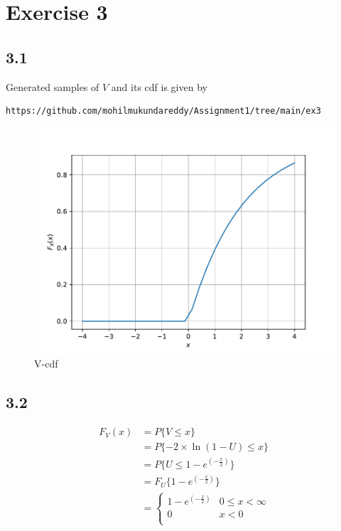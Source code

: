 \documentclass[journal,12pt,twocolumn]{IEEEtran}
\begin{document}
\section*{Exercise 3}
\subsection*{3.1}
Generated samples of $V$ and its cdf is given by
\begin{lstlisting}
https://github.com/mohilmukundareddy/Assignment1/tree/main/ex3
\end{lstlisting}
\begin{figure}[H]
    \centering
    \includegraphics[scale =0.5]{V_cdf.pdf}
    \caption{V-cdf}
    \label{fig:my_label3}
\end{figure}



\subsection*{3.2}
\begin{align*}
    F_V (x) &= P\{V \le x\} \\
            &= P\{-2\times \ln{(1-U)} \le x\} \\
            &= P\{U \le 1 - e^{(-\frac{x}{2})}\} \\ 
            &= F_U\{1- e^{(-\frac{x}{2})} \}\\
            &=
\begin{cases}
 1 - e^{(-\frac{x}{2})} & 0 \le x < \infty \\
 0  & x<0 \\
 \end{cases}
\end{align*} 
\end{document}
